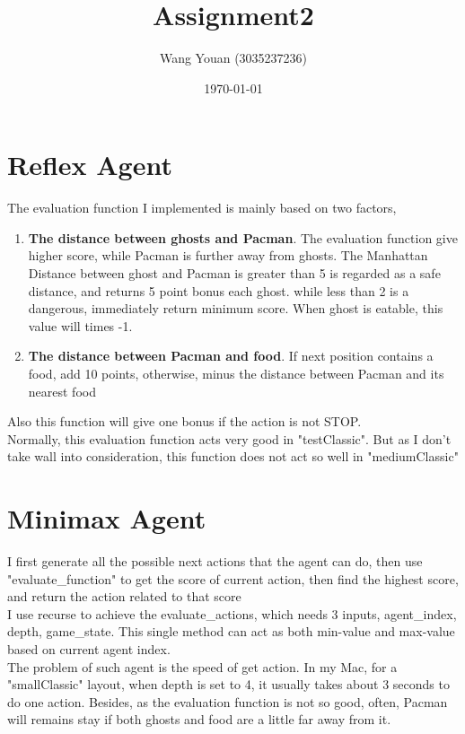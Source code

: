 \documentclass{article}
\title{Assignment2}
\author{Wang Youan (3035237236)}
\date{\today}
\begin{document}
	\maketitle
	\section{Reflex Agent}
	\label{sec:Q1}
	The evaluation function I implemented is mainly based on two factors,
	\begin{enumerate}
		\item \textbf{The distance between ghosts and Pacman}. The evaluation function give higher score, while Pacman is further away from ghosts. The Manhattan Distance between ghost and Pacman is greater than 5 is regarded as a safe distance, and returns 5 point bonus each ghost. while less than 2 is a dangerous, immediately return minimum score. When ghost is eatable, this value will times -1. 
		\item \textbf{The distance between Pacman and food}. If next position contains a food, add 10 points, otherwise, minus the distance between Pacman and its nearest food 
	\end{enumerate}
	Also this function will give one bonus if the action is not STOP.\\
	Normally, this evaluation function acts very good in "testClassic". But as I don't take wall into consideration, this function does not act so well in "mediumClassic"
	\section{Minimax Agent}
	\label{sec:Q2}
	I first generate all the possible next actions that the agent can do, then use "evaluate\_function" to get the score of current action, then find the highest score, and return the action related to that score\\
	I use recurse to achieve the evaluate\_actions, which needs 3 inputs, agent\_index, depth, game\_state. This single method can act as both min-value and max-value based on current agent index.\\
	The problem of such agent is the speed of get action. In my Mac, for a "smallClassic" layout, when depth is set to 4, it usually takes about 3 seconds to do one action. Besides, as the evaluation function is not so good, often, Pacman will remains stay if both ghosts and food are a little far away from it.
\end{document}
